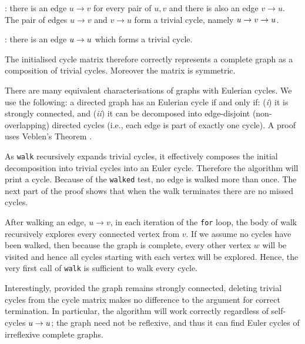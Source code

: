 \documentclass[12pt]{article}
\begin{document}
\begin{description}\raggedright
\item[$u\neq v$]:
there is an edge $u \rightarrow v$ for every pair of $u,v$ and there is also an edge $v \rightarrow u$. The pair of edges $u \rightarrow v$ and $v \rightarrow u$ form a trivial cycle, namely $\pair uv$. 
 
\item[$u=v$]: there is an edge $\pair uu$ which forms a trivial cycle. 
\end{description}
 
The initialised cycle matrix therefore correctly represents a complete graph as a composition of trivial cycles. Moreover the matrix is symmetric.

There are many equivalent characterisations of graphs with Eulerian cycles. We use the following: a directed graph has an Eulerian cycle if and only if: (\emph{i\/}) it is strongly connected, and (\emph{ii\/}) it can be decomposed into edge-disjoint (non-overlapping) directed cycles (i.e., each edge is part of exactly one cycle). A proof uses Veblen's Theorem \cite{graphbook}.

As \texttt{walk} recursively expands trivial cycles, it effectively composes the initial decomposition into trivial cycles into an Euler cycle. Therefore the algorithm will print a cycle. Because of the \texttt{walked} test, no edge is walked more than once. The next part of the proof shows that when the walk terminates there are no missed cycles.

After walking an edge, $u \rightarrow v$, in each iteration of the \texttt{for} loop, the body of walk recursively explores every connected vertex from $v$. If we assume no cycles have been walked, then because the graph is complete, every other vertex $w$ will be visited and hence all cycles starting with each vertex will be explored. Hence, the very first call of \texttt{walk} is sufficient to walk every cycle.

Interestingly, provided the graph remains strongly connected, deleting trivial cycles from the cycle matrix makes no difference to the argument for correct termination. In particular, the algorithm will work correctly regardless of self-cycles $\pair uu$; the graph need not be reflexive, and thus it can find Euler cycles of irreflexive complete graphs.

\end{document}
